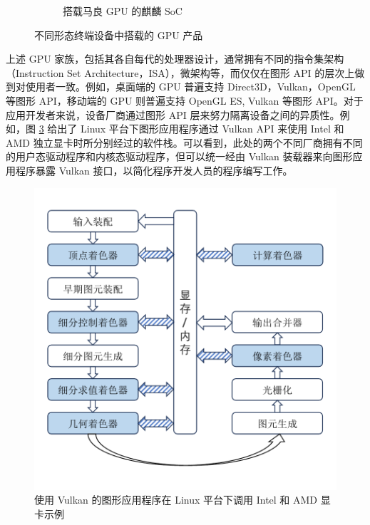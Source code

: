 \begin{figure}[htbp]
\begin{minipage}[b]{\textwidth}
\begin{subfigure}[b]{0.33\textwidth}
            \caption{搭载马良 GPU 的麒麟 SoC}
            \label{fig:sub_kirin9000s}
        \end{subfigure}
    \end{minipage}
    

    \caption{不同形态终端设备中搭载的 GPU 产品\cite{sapphire2024radeon, tpu2020intelcorei710700, bilibili2023huaweimate60pro}}
    \label{fig:gpu_gallery}
\end{figure}

{\amend 上述} GPU 家族，包括其各自每代的处理器设计，通常拥有不同的指令集架构（Instruction Set Architecture，ISA），微架构等，而仅仅在图形 API 的层次上做到对使用者一致。例如，桌面端的 GPU 普遍支持 Direct3D，Vulkan，OpenGL 等图形 API，移动端的 GPU 则普遍支持 OpenGL ES, Vulkan 等图形 API。对于应用开发者来说，设备厂商通过图形 API 层来努力隔离设备之间的异质性。例如，图 \ref{fig:drivers_overview} 给出了 Linux 平台下图形应用程序通过 Vulkan API 来使用 Intel 和 AMD 独立显卡时所分别经过的软件栈。可以看到，此处的两个不同厂商拥有不同的用户态驱动程序和内核态驱动程序，但可以统一经由 Vulkan 装载器来向图形应用程序暴露 Vulkan 接口，以简化程序开发人员的程序编写工作。

\begin{figure}
    \centering
    \includegraphics[page=2, width=0.8\linewidth]{figures/pictures.pdf}
    \caption{使用 Vulkan 的图形应用程序在 Linux 平台下调用 Intel 和 AMD 显卡示例}
    \label{fig:drivers_overview}
\end{figure}


